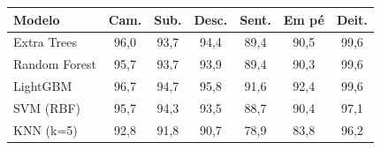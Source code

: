 \begin{tabular}{@{}lcccccc@{}}
\toprule
Modelo & Cam. & Sub. & Desc. & Sent. & Em pé & Deit.\\
\midrule
Extra Trees & 96,0 & 93,7 & 94,4 & 89,4 & 90,5 & 99,6\\
Random Forest & 95,7 & 93,7 & 93,9 & 89,4 & 90,3 & 99,6\\
LightGBM & 96,7 & 94,7 & 95,8 & 91,6 & 92,4 & 99,6\\
SVM (RBF) & 95,7 & 94,3 & 93,5 & 88,7 & 90,4 & 97,1\\
KNN (k=5) & 92,8 & 91,8 & 90,7 & 78,9 & 83,8 & 96,2\\
\bottomrule
\end{tabular}
